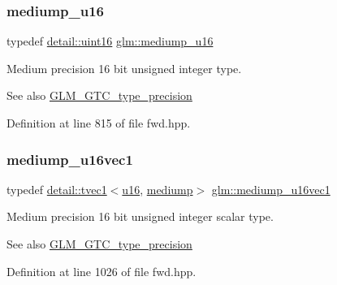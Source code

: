 \subsubsection{\texorpdfstring{mediump\+\_\+u16}{mediump\_u16}}
{\footnotesize\ttfamily typedef \hyperlink{namespaceglm_1_1detail_a47b2a7d006d187338e8031a352d1ce56}{detail\+::uint16} \hyperlink{group__gtc__type__precision_ga6745262ef6a6fdb8637b2387ef924828}{glm\+::mediump\+\_\+u16}}

Medium precision 16 bit unsigned integer type. \begin{DoxySeeAlso}{See also}
\hyperlink{group__gtc__type__precision}{G\+L\+M\+\_\+\+G\+T\+C\+\_\+type\+\_\+precision} 
\end{DoxySeeAlso}


Definition at line 815 of file fwd.\+hpp.

\mbox{\label{group__gtc__type__precision_gacb35d25d662b2a6396d094197ca834f0}} 
\subsubsection{\texorpdfstring{mediump\+\_\+u16vec1}{mediump\_u16vec1}}
{\footnotesize\ttfamily typedef \hyperlink{structglm_1_1detail_1_1tvec1}{detail\+::tvec1}$<$\hyperlink{group__gtc__type__precision_gae7a1571503f83d2264ddfa705a6b082a}{u16}, \hyperlink{namespaceglm_a0f04f086094c747d227af4425893f545a6416f3ea0c9025fb21ed50c4d6620482}{mediump}$>$ \hyperlink{group__gtc__type__precision_gacb35d25d662b2a6396d094197ca834f0}{glm\+::mediump\+\_\+u16vec1}}

Medium precision 16 bit unsigned integer scalar type. \begin{DoxySeeAlso}{See also}
\hyperlink{group__gtc__type__precision}{G\+L\+M\+\_\+\+G\+T\+C\+\_\+type\+\_\+precision} 
\end{DoxySeeAlso}


Definition at line 1026 of file fwd.\+hpp.

\mbox{\label{group__gtc__type__precision_ga93fe5ddc21391f0334eb3a60b76c390b}} 
